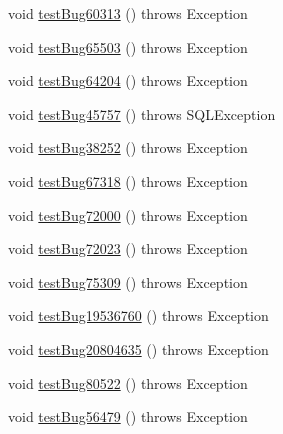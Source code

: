 \begin{DoxyCompactItemize}
\item 
void \mbox{\hyperlink{classtestsuite_1_1regression_1_1_result_set_regression_test_a0b66981060f0cf894fcac0ffacf7280d}{test\+Bug60313}} ()  throws Exception 
\item 
void \mbox{\hyperlink{classtestsuite_1_1regression_1_1_result_set_regression_test_aac9dd9e40e53b5f7b899b239d7c08406}{test\+Bug65503}} ()  throws Exception 
\item 
void \mbox{\hyperlink{classtestsuite_1_1regression_1_1_result_set_regression_test_a4c82635b5ff90ca43310f0523bf0b8a5}{test\+Bug64204}} ()  throws Exception 
\item 
void \mbox{\hyperlink{classtestsuite_1_1regression_1_1_result_set_regression_test_a38aab06b61d59c04df60b2ffd7dd9861}{test\+Bug45757}} ()  throws S\+Q\+L\+Exception 
\item 
void \mbox{\hyperlink{classtestsuite_1_1regression_1_1_result_set_regression_test_ae79fca0bd7d22ac046c30b0e69ae46e5}{test\+Bug38252}} ()  throws Exception 
\item 
void \mbox{\hyperlink{classtestsuite_1_1regression_1_1_result_set_regression_test_a1ef1850491041aac8a3c98968d839a10}{test\+Bug67318}} ()  throws Exception 
\item 
void \mbox{\hyperlink{classtestsuite_1_1regression_1_1_result_set_regression_test_ac5cb7a4e2ccabb68566100d643272bb4}{test\+Bug72000}} ()  throws Exception 
\item 
void \mbox{\hyperlink{classtestsuite_1_1regression_1_1_result_set_regression_test_a86a107fd1b712bfc306b455d84d42572}{test\+Bug72023}} ()  throws Exception 
\item 
void \mbox{\hyperlink{classtestsuite_1_1regression_1_1_result_set_regression_test_a21e609d74da6fad0483aeeec66375c7d}{test\+Bug75309}} ()  throws Exception 
\item 
void \mbox{\hyperlink{classtestsuite_1_1regression_1_1_result_set_regression_test_a84aedc11c7b191cccc83a821ad7b3927}{test\+Bug19536760}} ()  throws Exception 
\item 
void \mbox{\hyperlink{classtestsuite_1_1regression_1_1_result_set_regression_test_a73eb842a830acedbf8af195858dfc58f}{test\+Bug20804635}} ()  throws Exception 
\item 
void \mbox{\hyperlink{classtestsuite_1_1regression_1_1_result_set_regression_test_ad8d477bdbce9cdf7a7934f944d398fb3}{test\+Bug80522}} ()  throws Exception 
\item 
void \mbox{\hyperlink{classtestsuite_1_1regression_1_1_result_set_regression_test_a67434549c3d855d48d611b6eff810242}{test\+Bug56479}} ()  throws Exception 

\end{DoxyCompactItemize}
